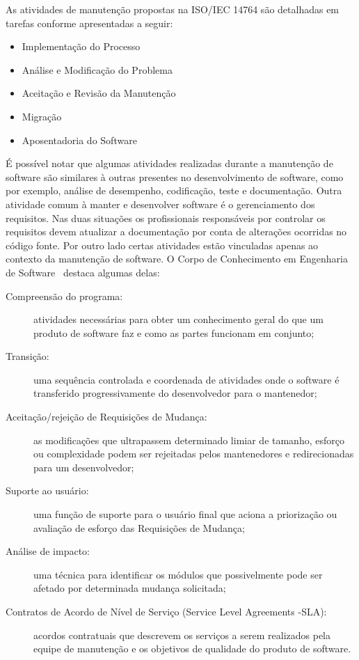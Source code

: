 As atividades de manutenção propostas na ISO/IEC 14764 são detalhadas em tarefas
conforme apresentadas a seguir:

\begin{itemize}
   	\item Implementação do Processo
   	\item Análise e Modificação do
		Problema
	\item Aceitação e Revisão da Manutenção
   	\item Migração
   	\item Aposentadoria do Software
\end{itemize}

É possível notar que algumas atividades realizadas durante a manutenção de
software são similares à outras presentes no desenvolvimento de software, como
por exemplo, análise de desempenho, codificação, teste e documentação. Outra
atividade comum à manter e desenvolver software é o gerenciamento dos
requisitos. Nas duas situações os profissionais responsáveis por controlar os
requisitos devem atualizar a do\-cu\-men\-ta\-ção  por conta de alterações
ocorridas no código fonte. Por outro lado certas atividades estão vinculadas
apenas ao contexto da manutenção de software. O Corpo de Conhecimento em
Engenharia de Software~\cite{4425813} destaca algumas delas:

\begin{description}
	\item[Compreensão do programa:] atividades necessárias para obter um
		conhecimento geral do que um produto de software faz e como as partes
		funcionam em conjunto;
	\item[Transição:] uma sequência controlada e coordenada de atividades onde o
		software é transferido progressivamente do desenvolvedor para o
		mantenedor;
	\item[Aceitação/rejeição de Requisições de Mudança:] as modificações
		que ultrapassem determinado limiar de tamanho, esforço ou complexidade
		podem ser rejeitadas pelos mantenedores e redirecionadas para um
		desenvolvedor;
	\item[Suporte ao usuário:] uma função de suporte para o usuário final que
		aciona a priorização ou avaliação de esforço das Requisições
		de Mudança;
	\item[Análise de impacto:] uma técnica para identificar os módulos que
		possivelmente pode ser afetado por determinada mudança solicitada;
	\item[Contratos de Acordo de Nível de Serviço (Service Level Agreements
		\@-\@ SLA):] acordos contratuais que descrevem os serviços a serem
		realizados pela equipe de manutenção e os objetivos de qualidade do
		produto de software.
\end{description}
\todoend{}

